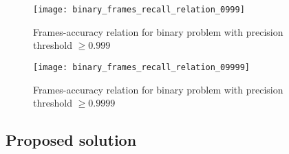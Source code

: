     \begin{figure}[H]
    \caption{Frames-accuracy relation for binary problem with precision threshold $\geqslant 0.999$}
    \centering
    \texttt{[image: binary\_frames\_recall\_relation\_0999]}
    \end{figure}

    \begin{figure}[H]
    \caption{Frames-accuracy relation for binary problem with precision threshold $\geqslant 0.9999$}
    \centering
    \texttt{[image: binary\_frames\_recall\_relation\_09999]}
    \end{figure}



    \subsection{Proposed solution}
